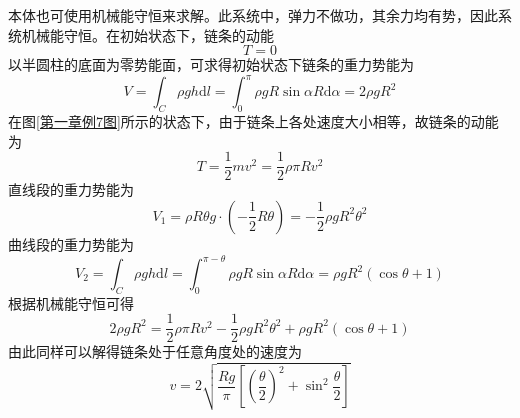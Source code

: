 \begin{solution}
本体也可使用机械能守恒来求解。此系统中，弹力不做功，其余力均有势，因此系统机械能守恒。在初始状态下，链条的动能
\begin{equation*}
	T = 0
\end{equation*}
以半圆柱的底面为零势能面，可求得初始状态下链条的重力势能为
\begin{equation*}
	V = \int_C \rho gh \mathrm{d} l = \int_0^\pi \rho g R\sin \alpha R\mathrm{d} \alpha = 2\rho gR^2
\end{equation*}
在图\ref{第一章例7图}所示的状态下，由于链条上各处速度大小相等，故链条的动能为
\begin{equation*}
	T = \frac12 mv^2 = \frac12 \rho \pi R v^2
\end{equation*}
直线段的重力势能为
\begin{equation*}
	V_1 = \rho R\theta g \cdot \left(-\frac12 R\theta\right) = -\frac12 \rho gR^2 \theta^2 
\end{equation*}
曲线段的重力势能为
\begin{equation*}
	V_2 = \int_C \rho gh \mathrm{d} l = \int_0^{\pi-\theta} \rho g R\sin \alpha R\mathrm{d} \alpha = \rho gR^2 (\cos \theta + 1)
\end{equation*}
根据机械能守恒可得
\begin{equation*}
	2\rho gR^2 = \frac12 \rho \pi R v^2 -\frac12 \rho gR^2 \theta^2 + \rho gR^2 (\cos \theta + 1)
\end{equation*}
由此同样可以解得链条处于任意角度处的速度为
\begin{equation*}
	v = 2\sqrt{\frac{Rg}{\pi}\left[\left(\frac{\theta}{2}\right)^2+ \sin^2 \frac{\theta}{2}\right]}
\end{equation*}
\end{solution}

